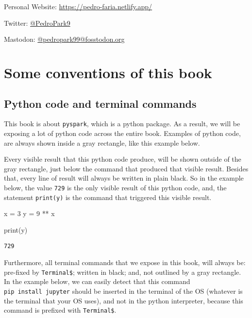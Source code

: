 \documentclass[
  11pt,
  letterpaper,
  DIV=11,
  numbers=noendperiod]{scrreprt}
\newenvironment{Shaded}{\begin{snugshade}}{\end{snugshade}}
\newcommand{\BuiltInTok}[1]{\textcolor[rgb]{0.00,0.23,0.31}{#1}}
\newcommand{\DecValTok}[1]{\textcolor[rgb]{0.68,0.00,0.00}{#1}}
\newcommand{\NormalTok}[1]{\textcolor[rgb]{0.00,0.23,0.31}{#1}}
\newcommand{\OperatorTok}[1]{\textcolor[rgb]{0.37,0.37,0.37}{#1}}
\begin{document}
Personal Website: \url{https://pedro-faria.netlify.app/}

Twitter: \href{https://twitter.com/PedroPark9}{@PedroPark9}

Mastodon:
\href{https://fosstodon.org/@pedropark99}{@pedropark99@fosstodon.org}

\hypertarget{some-conventions-of-this-book}{%
\section*{Some conventions of this
book}\label{some-conventions-of-this-book}}


\hypertarget{python-code-and-terminal-commands}{%
\subsection*{Python code and terminal
commands}\label{python-code-and-terminal-commands}}

This book is about \texttt{pyspark}, which is a python package. As a
result, we will be exposing a lot of python code across the entire book.
Examples of python code, are always shown inside a gray rectangle, like
this example below.

Every visible result that this python code produce, will be shown
outside of the gray rectangle, just below the command that produced that
visible result. Besides that, every line of result will always be
written in plain black. So in the example below, the value \texttt{729}
is the only visible result of this python code, and, the statement
\texttt{print(y)} is the command that triggered this visible result.

\begin{Shaded}
\begin{Highlighting}[]
\NormalTok{x }\OperatorTok{=} \DecValTok{3}
\NormalTok{y }\OperatorTok{=} \DecValTok{9} \OperatorTok{**}\NormalTok{ x}

\BuiltInTok{print}\NormalTok{(y)}
\end{Highlighting}
\end{Shaded}

\begin{verbatim}
729
\end{verbatim}

Furthermore, all terminal commands that we expose in this book, will
always be: pre-fixed by \texttt{Terminal\$}; written in black; and, not
outlined by a gray rectangle. In the example below, we can easily detect
that this command \texttt{pip\ install\ jupyter} should be inserted in
the terminal of the OS (whatever is the terminal that your OS uses), and
not in the python interpreter, because this command is prefixed with
\texttt{Terminal\$}.
\end{document}
